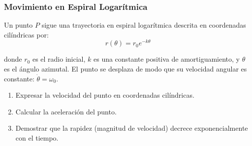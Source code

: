 
\subsubsection{Movimiento en Espiral Logarítmica}

Un punto $P$ sigue una trayectoria en espiral logarítmica descrita en coordenadas cilíndricas por:
$$r(\theta) = r_0 e^{-k\theta}$$

donde $r_0$ es el radio inicial, $k$ es una constante positiva de amortiguamiento, y $\theta$ es el ángulo azimutal. El punto se desplaza de modo que su velocidad angular es constante: $\dot{\theta} = \omega_0$.

\begin{enumerate}
    \item Expresar la velocidad del punto en coordenadas cilíndricas.
    \item Calcular la aceleración del punto.
    \item Demostrar que la rapidez (magnitud de velocidad) decrece exponencialmente con el tiempo.
\end{enumerate}

